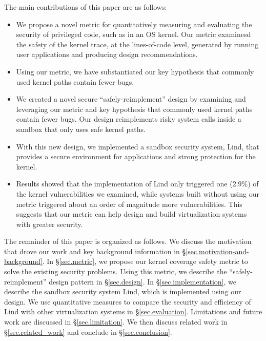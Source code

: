 The main contributions of this paper are as follows: 
\begin{itemize}
\item We propose a novel metric for quantitatively measuring and evaluating the
security of privileged code, such as in an OS kernel. Our metric examinesd
the safety of the kernel trace, at the lines-of-code level, generated by
running user applications and producing design recommendations.
\item Using our metric, we have substantiated our key hypothesis that commonly
used kernel paths contain fewer bugs. 
\item We created a novel secure ``safely-reimplement'' design by examining and
leveraging our metric and key hypothesis that commonly used kernel paths
contain fewer bugs. Our design reimplements risky system calls inside a
sandbox that only uses safe kernel paths. 
\item With this new design, we implemented a sandbox security system, Lind, that
provides a secure environment for applications and strong protection for
the kernel.
\item Results showed that the implementation of Lind only triggered one (2.9\%) of
the kernel vulnerabilities we examined, while systems built without using
our metric triggered about an order of magnitude more vulnerabilities. This
suggests that our metric can help design and build virtualization systems
with greater security. 
\end{itemize}


The remainder of this paper is organized as follows. 
We discuss the motivation that drove our work and key background information 
in \S{\ref{sec.motivation-and-background}}. 
In \S{\ref{sec.metric}}, we propose our kernel coverage safety metric to solve 
the existing security problems.  Using this metric, we describe the 
``safely-reimplement'' design pattern in \S{\ref{sec.design}}. In 
\S{\ref{sec.implementation}}, we describe the sandbox security 
system Lind, which is implemented using our design. We use quantitative 
measures to compare the security and efficiency of Lind with other 
virtualization systems in \S{\ref{sec.evaluation}}. 
Limitations and future work are discussed in \S{\ref{sec.limitation}}.  
We then discuss related work in \S{\ref{sec.related_work}} and conclude
in \S{\ref{sec.conclusion}}.

